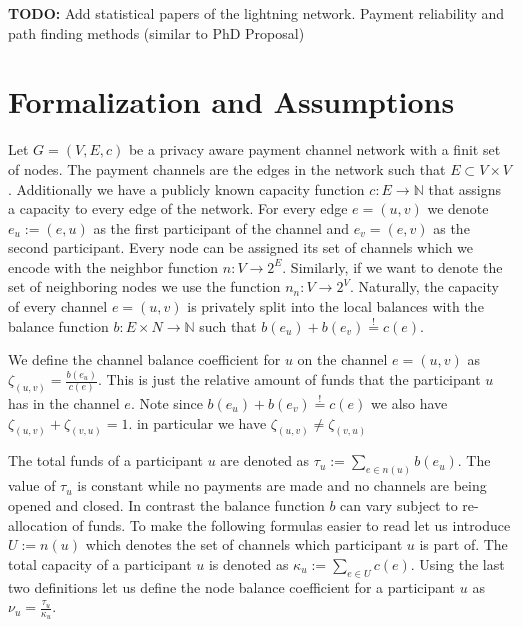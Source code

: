 \documentclass[a4paper]{paper}
\begin{document}
\textbf{TODO:} Add statistical papers of the lightning network. Payment reliability and path finding methods (similar to PhD Proposal)


\section{Formalization and Assumptions}
\label{sec:formalization}

Let $G=(V,E,c)$ be a privacy aware payment channel network with a finit set of nodes.
The payment channels are the edges in the network such that $E\subset V\times V$.
Additionally we have a publicly known capacity function $c: E\longrightarrow \mathbb{N}$ that assigns a capacity to every edge of the network.
For every edge $e=(u,v)$ we denote $e_u:=(e,u)$ as the first participant of the channel and $e_v=(e,v)$ as the second participant.
Every node can be assigned its set of channels which we encode with the neighbor function $n : V \longrightarrow 2^{E}$.
Similarly, if we want to denote the set of neighboring nodes we use the function $n_n : V \longrightarrow 2^{V}$.
Naturally, the capacity of every channel $e=(u,v)$ is privately split into the local balances with the balance function $b: E\times N\longrightarrow\mathbb{N}$ such that $b(e_u)+b(e_v)\stackrel{!}{=}c(e)$.

We define the channel balance coefficient for $u$ on the channel $e=(u,v)$ as  $\zeta_{(u,v)} = \frac{b(e_u)}{c(e)}$.
This is just the relative amount of funds that the participant $u$ has in the channel $e$.
Note since $b(e_u)+b(e_v)\stackrel{!}{=}c(e)$ we also have $\zeta_{(u,v)} + \zeta_{(v,u)}=1$.
in particular we have $\zeta_{(u,v)} \neq \zeta_{(v,u)}$ 

The total funds of a participant $u$ are denoted as $\tau_u:=\displaystyle{\sum_{e\in n(u)}b(e_u)}$.
The value of $\tau_u$ is constant while no payments are made and no channels are being opened and closed.
In contrast the balance function $b$ can vary subject to re-allocation of funds.
To make the following formulas easier to read let us introduce $U:=n(u)$ which denotes the set of channels which participant $u$ is part of.
The total capacity of a participant $u$ is denoted as $\kappa_u:=\displaystyle{\sum_{e\in U}c(e)}$.
Using the last two definitions let us define the node balance coefficient for a participant $u$ as $\nu_u = \frac{\tau_u}{\kappa_u}$.
\end{document}
